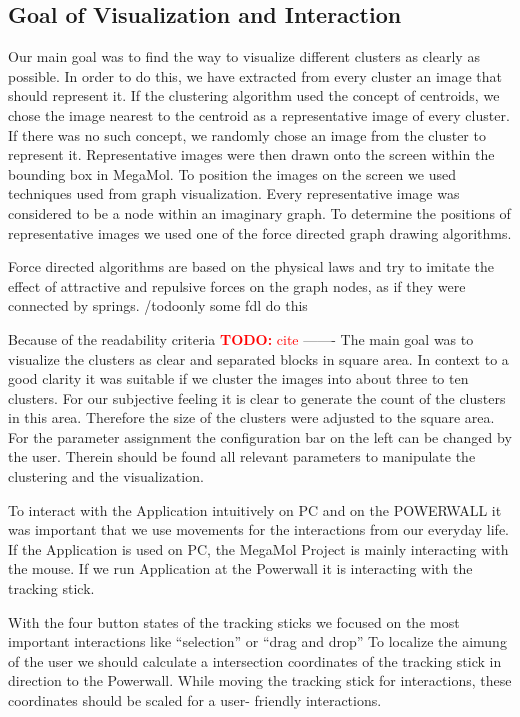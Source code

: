 \documentclass[journal]{vgtc}       %
\newcommand{\todo}[1]{\textcolor{red}{\textbf{TODO:} #1}}
\begin{document}
\subsection{Goal of Visualization and Interaction}
Our main goal was to find the way to visualize different clusters as clearly as possible. In order to do this, we have extracted from every cluster an image that should represent it. If the clustering algorithm used the concept of centroids, we chose the image nearest to the centroid as a representative image of every cluster. If there was no such concept, we randomly chose an image from the cluster to represent it. 
Representative images were then drawn onto the screen within the bounding box in MegaMol.
To position the images on the screen we used techniques used from graph visualization. Every representative image was considered to be a node within an imaginary graph. To determine the positions of representative images we used one of the force directed graph drawing algorithms. 

Force directed algorithms are based on the physical laws and try to imitate the effect of attractive and repulsive forces on the graph nodes, as if they were connected by springs. /todo{only some fdl do this}


Because of the readability criteria \todo{cite}
-------
The main goal was to visualize the clusters as clear and separated blocks in square area. In context to a good clarity it was suitable if we cluster the images into about three to ten clusters. For our subjective feeling it is clear to generate the count of the clusters in this area. Therefore the size of the clusters were adjusted to the square area. For the parameter assignment the configuration bar on the left can be changed by the user. Therein should be found all relevant parameters to manipulate the clustering and the visualization.

To interact with the Application intuitively on PC and on the POWERWALL it was important that we use movements for the interactions from our everyday life. If the Application is used on PC, the MegaMol Project is mainly interacting with the mouse. If we run Application at the Powerwall it is interacting with the tracking stick.

With the four button states of the tracking sticks we focused on the most important interactions like ``selection'' or ``drag and drop'' To localize the aimung of the user  we should calculate a intersection coordinates of the tracking stick in direction to the Powerwall. While moving the tracking stick for interactions, these coordinates should be scaled for a user- friendly interactions.
\end{document}
